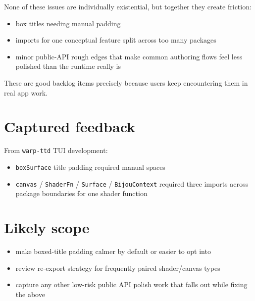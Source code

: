 None of these issues are individually existential, but together they create friction:

\begin{itemize}
\tightlist
\item
  box titles needing manual padding
\item
  imports for one conceptual feature split across too many packages
\item
  minor public-API rough edges that make common authoring flows feel less polished than the runtime really is
\end{itemize}

These are good backlog items precisely because users keep encountering them in real app work.

\section{Captured feedback}\label{record-337-captured-feedback}

From \texttt{w\allowbreak{}a\allowbreak{}r\allowbreak{}p\allowbreak{}-\allowbreak{}t\allowbreak{}t\allowbreak{}d} TUI development:

\begin{itemize}
\tightlist
\item
  \texttt{b\allowbreak{}o\allowbreak{}x\allowbreak{}S\allowbreak{}u\allowbreak{}r\allowbreak{}f\allowbreak{}a\allowbreak{}c\allowbreak{}e} title padding required manual spaces
\item
  \texttt{c\allowbreak{}a\allowbreak{}n\allowbreak{}v\allowbreak{}a\allowbreak{}s} / \texttt{S\allowbreak{}h\allowbreak{}a\allowbreak{}d\allowbreak{}e\allowbreak{}r\allowbreak{}F\allowbreak{}n} / \texttt{S\allowbreak{}u\allowbreak{}r\allowbreak{}f\allowbreak{}a\allowbreak{}c\allowbreak{}e} / \texttt{B\allowbreak{}i\allowbreak{}j\allowbreak{}o\allowbreak{}u\allowbreak{}C\allowbreak{}o\allowbreak{}n\allowbreak{}t\allowbreak{}e\allowbreak{}x\allowbreak{}t} required three imports across package boundaries for one shader function
\end{itemize}

\section{Likely scope}\label{record-337-likely-scope}

\begin{itemize}
\tightlist
\item
  make boxed-title padding calmer by default or easier to opt into
\item
  review re-export strategy for frequently paired shader/canvas types
\item
  capture any other low-risk public API polish work that falls out while fixing the above
\end{itemize}

